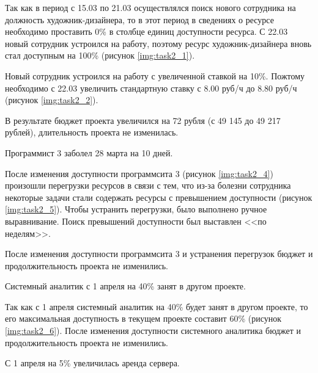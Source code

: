 \documentclass{bmstu}
\begin{document}
Так как в период с 15.03 по 21.03 осуществлялся поиск нового сотрудника на должность художник-дизайнера, то в этот период  в сведениях о ресурсе необходимо проставить 0\% в столбце единиц доступности ресурса. С 22.03 новый сотрудник устроился на работу, поэтому ресурс художник-дизайнера вновь стал доступным на 100\% (рисунок \ref{img:task2_1}).


Новый сотрудник устроился на работу с увеличенной ставкой на 10\%.
Пожтому необходимо с 22.03 увеличить стандартную ставку с 8.00 руб/ч до 8.80 руб/ч (рисунок \ref{img:task2_2}).

В результате бюджет проекта увеличился на 72 рубля (с 49 145 до 49 217 рублей), длительность проекта не изменилась.


\clearpage

Программист 3 заболел 28 марта на 10 дней.


После изменения доступности программсита 3 (рисунок \ref{img:task2_4}) произошли перегрузки ресурсов в связи с тем, что из-за болезни сотрудника некоторые задачи стали содержать ресурсы с превышением доступности (рисунок \ref{img:task2_5}). Чтобы устранить перегрузки, было выполнено ручное выравнивание. Поиск превышений доступности был выставлен <<по неделям>>.


После изменения доступности программсита 3 и устранения перегрузок бюджет и продолжительность проекта не изменились.

\clearpage

Системный аналитик с 1 апреля на 40\% занят в другом проекте.


Так как с 1 апреля системный аналитик на 40\% будет занят в другом проекте, то его максимальная доступность в текущем проекте составит 60\% (рисунок \ref{img:task2_6}). После изменения доступности системного аналитика бюджет и продолжительность проекта не изменились.


С 1 апреля на 5\% увеличилась аренда сервера.

\end{document}
